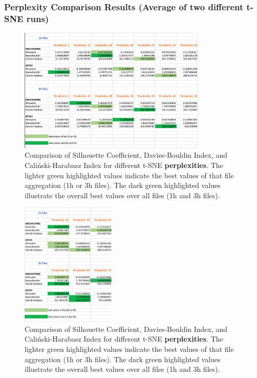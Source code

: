 \subsubsection{Perplexity Comparison Results (Average of two different t-SNE runs)}
\label{appendix:compareAveragePerplexity}

\begin{figure}[H]
  \centering
  \includegraphics[width=0.8\textwidth]{./images/tsneParametersTest/perplexity/perplexityEvaluationScoresAverage.png}
  \caption{Comparison of Silhouette Coefficient, Davies-Bouldin Index, and Caliński-Harabasz Index for different t-SNE \textbf{perplexities}. The lighter green highlighted values indicate the best values of that file aggregation (1h or 3h files). The dark green highlighted values illustrate the overall best values over all files (1h and 3h files).}
  \label{figure:perplexityEvaluationScoresAverage}
\end{figure}

\begin{figure}[H]
  \centering
  \includegraphics[width=0.4\textwidth]{./images/tsneParametersTest/perplexity/perplexityEvaluationScoresDetailedAverage.png}
  \caption{Comparison of Silhouette Coefficient, Davies-Bouldin Index, and Caliński-Harabasz Index for different t-SNE \textbf{perplexities}. The lighter green highlighted values indicate the best values of that file aggregation (1h or 3h files). The dark green highlighted values illustrate the overall best values over all files (1h and 3h files).}
  \label{figure:perplexityEvaluationScoresDetailedAverage}
\end{figure}


\clearpage